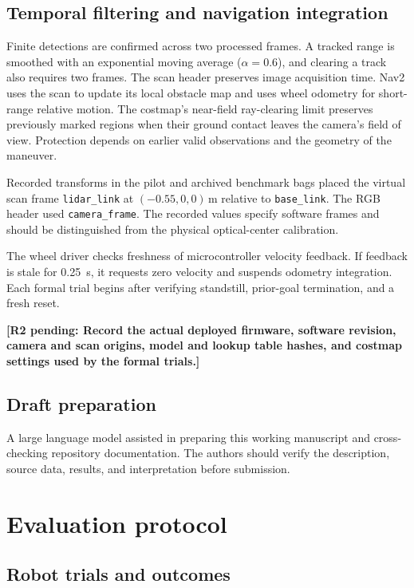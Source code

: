 \documentclass[pdflatex,sn-mathphys-num]{sn-jnl}
\newif\ifdraftreview
\newcommand{\reviewbadge}[1]{%
  \colorbox{reviewfill}{\textcolor{reviewink}{\sffamily\bfseries\strut #1}}}
\newcommand{\pending}[2]{%
  \ifdraftreview
    \hyperlink{author-checklist}{\reviewbadge{#1}}\nobreak\space
    \textcolor{reviewink}{\textbf{[Pending: #2]}}%
  \else
    \textbf{[#1 pending: #2]}%
  \fi}
\newcommand{\m}{\,\mathrm{m}}
\begin{document}
\subsection{Temporal filtering and navigation integration}\label{sec:deployed-setup}

Finite detections are confirmed across two processed frames. A tracked range is smoothed with an exponential moving average ($\alpha=0.6$), and clearing a track also requires two frames. The scan header preserves image acquisition time. Nav2 uses the scan to update its local obstacle map and uses wheel odometry for short-range relative motion. The costmap's near-field ray-clearing limit preserves previously marked regions when their ground contact leaves the camera's field of view. Protection depends on earlier valid observations and the geometry of the maneuver.

Recorded transforms in the pilot and archived benchmark bags placed the virtual scan frame \texttt{lidar\_link} at $(-0.55,0,0)\m$ relative to \texttt{base\_link}. The RGB header used \texttt{camera\_frame}. The recorded values specify software frames and should be distinguished from the physical optical-center calibration.

The wheel driver checks freshness of microcontroller velocity feedback. If feedback is stale for 0.25~s, it requests zero velocity and suspends odometry integration. Each formal trial begins after verifying standstill, prior-goal termination, and a fresh reset. \pending{R2}{Record the actual deployed firmware, software revision, camera and scan origins, model and lookup table hashes, and costmap settings used by the formal trials.}

\subsection{Draft preparation}

A large language model assisted in preparing this working manuscript and cross-checking repository documentation. The authors should verify the description, source data, results, and interpretation before submission.

\section{Evaluation protocol}\label{sec:evaluation}

\subsection{Robot trials and outcomes}
\end{document}
